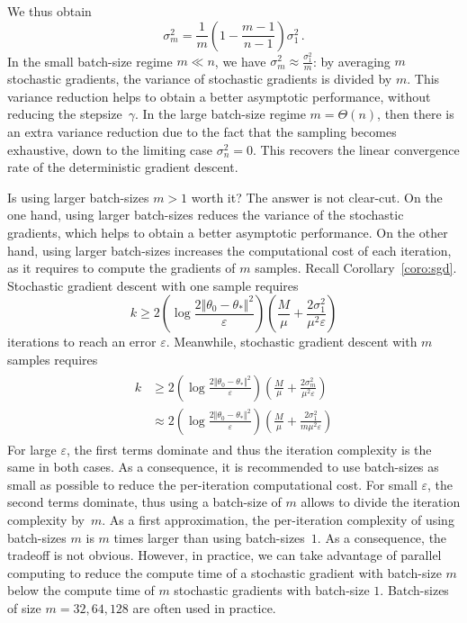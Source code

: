 \documentclass[11pt,reqno]{article}
\renewcommand{\geq}{\geqslant}
\numberwithin{equation}{section}
\theoremstyle{plain}
\theoremstyle{definition}
\theoremstyle{remark}
\begin{document}
We thus obtain 
\begin{equation*}
	\sigma^2_m = \frac{1}{m} \left(1-\frac{m-1}{n-1}\right)\sigma_1^2 \, .
\end{equation*}
In the small batch-size regime $m \ll n$, we have $\sigma^2_m \approx \frac{\sigma^2_1}{m}$: by averaging $m$ stochastic gradients, the variance of stochastic gradients is divided by $m$. This variance reduction helps to obtain a better asymptotic performance, without reducing the stepsize~$\gamma$. In the large batch-size regime $m = \Theta(n)$, then there is an extra variance reduction due to the fact that the sampling becomes exhaustive, down to the limiting case $\sigma^2_n = 0$. This recovers the linear convergence rate of the deterministic gradient descent.

Is using larger batch-sizes $m>1$ worth it? The answer is not clear-cut. On the one hand, using larger batch-sizes reduces the variance of the stochastic gradients, which helps to obtain a better asymptotic performance. On the other hand, using larger batch-sizes increases the computational cost of each iteration, as it requires to compute the gradients of $m$ samples. Recall Corollary~\ref{coro:sgd}. Stochastic gradient descent with one sample requires 
\begin{equation*}
	k \geq 2 \left(\log \frac{2 \Vert \theta_0 - \theta_* \Vert^2}{\varepsilon}\right) \left(\frac{M}{\mu} + \frac{2\sigma^2_1}{\mu^2 \varepsilon}\right)
\end{equation*}
iterations to reach an error $\varepsilon$. Meanwhile, stochastic gradient descent with $m$ samples requires
\begin{align}
	\label{eq:train-minibatch-precision}
	\begin{split}
	k &\geq 2 \left(\log \frac{2 \Vert \theta_0 - \theta_* \Vert^2}{\varepsilon}\right) \left(\frac{M}{\mu} + \frac{2\sigma^2_m}{\mu^2 \varepsilon}\right) \\
	&\approx 2\left(\log \frac{2 \Vert \theta_0 - \theta_* \Vert^2}{\varepsilon}\right) \left(\frac{M}{\mu} + \frac{2\sigma^2_1}{m\mu^2 \varepsilon}\right)
	\end{split}
\end{align}
For large $\varepsilon$, the first terms dominate and thus the iteration complexity is the same in both cases. As a consequence, it is recommended to use batch-sizes as small as possible to reduce the per-iteration computational cost. For small $\varepsilon$, the second terms dominate, thus using a batch-size of $m$ allows to divide the iteration complexity by~$m$. As a first approximation, the per-iteration complexity of using batch-sizes $m$ is $m$ times larger than using batch-sizes~$1$. As a consequence, the tradeoff is not obvious. However, in practice, we can take advantage of parallel computing to reduce the compute time of a stochastic gradient with batch-size $m$ below the compute time of $m$ stochastic gradients with batch-size $1$. Batch-sizes of size $m = 32, 64,128$ are often used in practice. 
\end{document}
